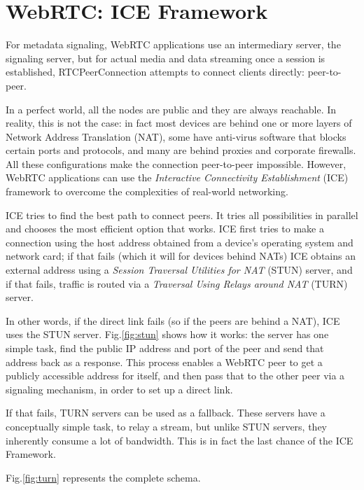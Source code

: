 \section{WebRTC: ICE Framework}
\label{sec:webrtc_ice}
For metadata signaling, WebRTC applications use an intermediary server, the signaling server, but for actual media and data streaming once a session is established, RTCPeerConnection attempts to connect clients directly: peer-to-peer. 

In a perfect world, all the nodes are public and they are always reachable. In reality, this is not the case: in fact most devices are behind one or more layers of Network Address Translation (NAT)\cite{nat}, some have anti-virus software that blocks certain ports and protocols, and many are behind proxies and corporate firewalls. All these configurations make the connection peer-to-peer impossible. However, WebRTC applications can use the \textit{Interactive Connectivity Establishment} (ICE) framework to overcome the complexities of real-world networking. 

ICE tries to find the best path to connect peers. It tries all possibilities in parallel and chooses the most efficient option that works. ICE first tries to make a connection using the host address obtained from a device's operating system and network card; if that fails (which it will for devices behind NATs) ICE obtains an external address using a \textit{Session Traversal Utilities for NAT} (STUN) server, and if that fails, traffic is routed via a \textit{Traversal Using Relays around NAT} (TURN) server\cite{webrtc_infrastructure}. 

In other words, if the direct link fails (so if the peers are behind a NAT), ICE uses the STUN server. Fig.\ref{fig:stun} shows how it works: the server has one simple task, find the public IP address and port of the peer and send that address back as a response.  This process enables a WebRTC peer to get a publicly accessible address for itself, and then pass that to the other peer via a signaling mechanism, in order to set up a direct link.

If that fails, TURN servers can be used as a fallback. These servers have a conceptually simple task, to relay a stream, but unlike STUN servers, they inherently consume a lot of bandwidth. This is in fact the last chance of the ICE Framework.

Fig.\ref{fig:turn} represents the complete schema.

